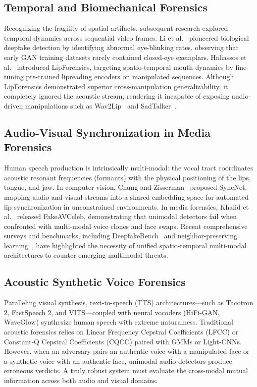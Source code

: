 \documentclass[journal]{IEEEtran}
\begin{document}
\subsection{Temporal and Biomechanical Forensics}
Recognizing the fragility of spatial artifacts, subsequent research explored temporal dynamics across sequential video frames. Li et al.~\cite{li2018ictu} pioneered biological deepfake detection by identifying abnormal eye-blinking rates, observing that early GAN training datasets rarely contained closed-eye exemplars. Haliassos et al.~\cite{haliassos2021lips} introduced LipForensics, targeting spatio-temporal mouth dynamics by fine-tuning pre-trained lipreading encoders on manipulated sequences. Although LipForensics demonstrated superior cross-manipulation generalizability, it completely ignored the acoustic stream, rendering it incapable of exposing audio-driven manipulations such as Wav2Lip~\cite{prajwal2020lip} and SadTalker~\cite{zhang2023sadtalker}.

\subsection{Audio-Visual Synchronization in Media Forensics}
Human speech production is intrinsically multi-modal: the vocal tract coordinates acoustic resonant frequencies (formants) with the physical positioning of the lips, tongue, and jaw. In computer vision, Chung and Zisserman~\cite{chung2017out} proposed SyncNet, mapping audio and visual streams into a shared embedding space for automated lip synchronization in unconstrained environments. In media forensics, Khalid et al.~\cite{khalid2021fakeavceleb} released FakeAVCeleb, demonstrating that unimodal detectors fail when confronted with multi-modal voice clones and face swaps. Recent comprehensive surveys and benchmarks, including DeepfakeBench~\cite{yan2024deepfakebench} and neighbor-preserving learning~\cite{chen2024npr}, have highlighted the necessity of unified spatio-temporal multi-modal architectures to counter emerging multimodal threats.

\subsection{Acoustic Synthetic Voice Forensics}
Paralleling visual synthesis, text-to-speech (TTS) architectures—such as Tacotron 2, FastSpeech 2, and VITS—coupled with neural vocoders (HiFi-GAN, WaveGlow) synthesize human speech with extreme naturalness. Traditional acoustic forensics relies on Linear Frequency Cepstral Coefficients (LFCC) or Constant-Q Cepstral Coefficients (CQCC) paired with GMMs or Light-CNNs. However, when an adversary pairs an authentic voice with a manipulated face or a synthetic voice with an authentic face, unimodal audio detectors produce erroneous verdicts. A truly robust system must evaluate the cross-modal mutual information across both audio and visual domains.
\end{document}
